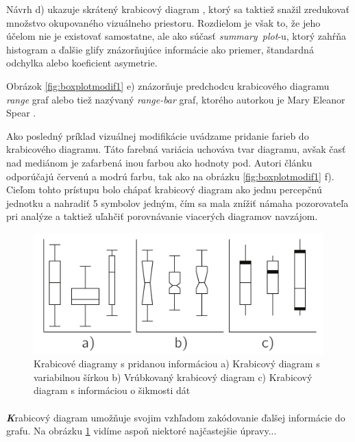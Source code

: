 Návrh d) ukazuje skrátený krabicový diagram \cite{VisualSummaryPotter}, ktorý sa taktiež snažil zredukovať množstvo okupovaného vizuálneho priestoru. Rozdielom je však to, že jeho účelom nie je existovať samostatne, ale ako súčasť \mbox{\textit{summary plot}-u}, ktorý zahŕňa histogram a ďalšie glify znázorňujúce informácie ako priemer, štandardná odchylka alebo koeficient asymetrie.

Obrázok \ref{fig:boxplotmodif1} e) znázorňuje predchodcu krabicového diagramu \textit{range} graf alebo tiež nazývaný \mbox{\textit{range-bar}} graf, ktorého autorkou je Mary Eleanor Spear \cite{Spear}.

Ako posledný príklad vizuálnej modifikácie uvádzame pridanie farieb do krabicového diagramu. Táto farebná variácia uchováva tvar diagramu, avšak časť nad mediánom je zafarbená inou farbou ako hodnoty pod. Autori článku odporúčajú červenú a modrú farbu, tak ako na obrázku \ref{fig:boxplotmodif1} f). Cieľom tohto prístupu bolo chápať krabicový diagram ako jednu percepčnú jednotku a nahradiť 5 symbolov jedným, čím sa mala znížiť námaha pozorovateľa pri analýze a taktiež uľahčiť porovnávanie viacerých diagramov navzájom. 


\begin{figure}
	\centering
	\includegraphics[width = 6in]{boxplot3}
	\caption{Krabicové diagramy s pridanou informáciou a) Krabicový diagram s variabilnou šírkou \cite{McGill} b) Vrúbkovaný krabicový diagram \cite{McGill} c) Krabicový diagram s informáciou o šikmosti dát \cite{Chamnein}}
	\label{fig:boxplotmodif2}
\end{figure}


\paragraph{}
{\large \textbf{\textit{K}}}rabicový diagram umožňuje svojim vzhľadom zakódovanie ďalšej informácie do grafu. Na obrázku \ref{fig:boxplotmodif2} vidíme aspoň niektoré najčastejšie úpravy... %

